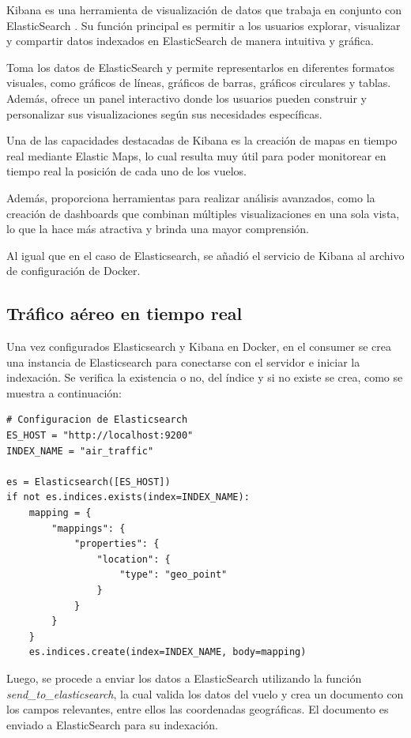 \documentclass{article}
\begin{document}
Kibana es una herramienta de visualización de datos que trabaja en conjunto con ElasticSearch \cite{Kibana}. Su función principal es permitir a los usuarios explorar, visualizar y compartir datos indexados en ElasticSearch de manera intuitiva y gráfica.

Toma los datos de ElasticSearch y permite representarlos en diferentes formatos visuales, como gráficos de líneas, gráficos de barras, gráficos circulares y tablas. Además, ofrece un panel interactivo donde los usuarios pueden construir y personalizar sus visualizaciones según sus necesidades específicas.

Una de las capacidades destacadas de Kibana es la creación de mapas en tiempo real mediante Elastic Maps, lo cual resulta muy útil para poder monitorear en tiempo real la posición de cada uno de los vuelos.

Además, proporciona herramientas para realizar análisis avanzados, como la creación de dashboards que combinan múltiples visualizaciones en una sola vista, lo que la hace más atractiva y brinda una mayor comprensión. 

Al igual que en el caso de Elasticsearch, se añadió el servicio de Kibana al archivo de configuración de Docker.

\subsection{Tráfico aéreo en tiempo real}
Una vez configurados Elasticsearch y Kibana en Docker, en el consumer se crea una instancia de Elasticsearch para conectarse con el servidor e iniciar la indexación. Se verifica la existencia o no, del índice y si no existe se crea, como se muestra a continuación: 

\begin{lstlisting}[style=python]
# Configuracion de Elasticsearch
ES_HOST = "http://localhost:9200"
INDEX_NAME = "air_traffic"

es = Elasticsearch([ES_HOST])
if not es.indices.exists(index=INDEX_NAME):
    mapping = {
        "mappings": {
            "properties": {
                "location": {
                    "type": "geo_point"
                }
            }
        }
    }
    es.indices.create(index=INDEX_NAME, body=mapping)
\end{lstlisting}

Luego, se procede a enviar los datos a ElasticSearch utilizando la función \textit{send\_to\_elasticsearch}, la cual valida los datos del vuelo y crea un documento con los campos relevantes, entre ellos las coordenadas geográficas. El documento es enviado a ElasticSearch para su indexación.
\end{document}
